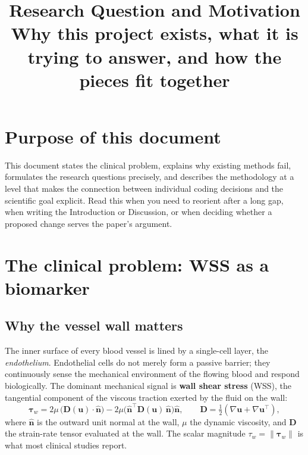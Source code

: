 \documentclass[11pt]{article}
\title{\bfseries Research Question and Motivation\\[0.3em]
\large Why this project exists, what it is trying to answer, and how the pieces fit together}
\author{}
\date{}
\begin{document}
\maketitle

\section*{Purpose of this document}
This document states the clinical problem, explains why existing methods fail, formulates
the research questions precisely, and describes the methodology at a level that makes the
connection between individual coding decisions and the scientific goal explicit.
Read this when you need to reorient after a long gap, when writing the Introduction or
Discussion, or when deciding whether a proposed change serves the paper's argument.

\tableofcontents
\newpage

\section{The clinical problem: WSS as a biomarker}

\subsection*{Why the vessel wall matters}

The inner surface of every blood vessel is lined by a single-cell layer, the
\emph{endothelium}.  Endothelial cells do not merely form a passive barrier; they
continuously sense the mechanical environment of the flowing blood and respond
biologically.  The dominant mechanical signal is \textbf{wall shear stress} (WSS),
the tangential component of the viscous traction exerted by the fluid on the wall:
\begin{equation}
    \boldsymbol{\tau}_w
    = 2\mu\,\bigl(\mathbf{D}(\mathbf{u})\cdot\hat{\mathbf{n}}\bigr)
      - 2\mu\bigl(\hat{\mathbf{n}}^\top \mathbf{D}(\mathbf{u})\,\hat{\mathbf{n}}\bigr)\hat{\mathbf{n}},
    \qquad
    \mathbf{D} = \tfrac{1}{2}(\nabla\mathbf{u} + \nabla\mathbf{u}^\top),
    \label{eq:wss_def}
\end{equation}
where $\hat{\mathbf{n}}$ is the outward unit normal at the wall, $\mu$ the dynamic
viscosity, and $\mathbf{D}$ the strain-rate tensor evaluated at the wall.
The scalar magnitude $\tau_w = \|\boldsymbol{\tau}_w\|$ is what most clinical studies report.
\end{document}
